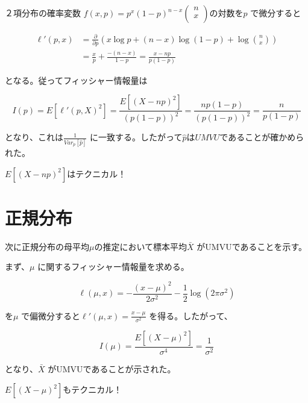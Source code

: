 \documentclass[
  letterpaper,
  DIV=11,
  numbers=noendperiod]{scrartcl}
\theoremstyle{plain}
\theoremstyle{remark}
\begin{document}
２項分布の確率変数 \(f(x,p)=p^x(1-p)^{n-x}\begin{pmatrix}
n  \\
x  \\
\end{pmatrix}\)の対数を\(p\) で微分すると

\[
\begin{aligned}
    \ell'(p, x) &= \frac{\partial}{\partial p} \left( x \log p + (n - x) \log (1 - p) + \log \binom{n}{x} \right) \\
    &= \frac{x}{p}+\frac{-(n-x)}{1-p} = \frac{x-np}{p(1-p)}
\end{aligned}
\]

となる。従ってフィッシャー情報量は

\[
I(p)=E[\ell'(p,X)^2]=\frac{E[(X-np)^2]}{(p(1-p))^2} =\frac{np(1-p)}{(p(1-p))^2} = \frac{n}{p(1-p)}
\]

となり、これは\(\displaystyle \frac{1}{Var_p[\hat{p}]}\)
に一致する。したがって\(\hat{p}\)は\(UMVU\)であることが確かめられた。

\(E[(X-np)^2]\)はテクニカル！

\section{正規分布}\label{ux6b63ux898fux5206ux5e03}

次に正規分布の母平均\(\mu\)の推定において標本平均\(\bar{X}\)
がUMVUであることを示す。

まず、\(\mu\) に関するフィッシャー情報量を求める。

\[
\ell(\mu,x)= - \frac{(x-\mu)^2}{2\sigma^2} - \frac{1}{2} \log(2\pi \sigma^2)
\]

を\(\mu\)
で偏微分すると\(\displaystyle \ell'(\mu,x)=\frac{x-\mu}{\sigma^2}\)
を得る。したがって、

\[
I(\mu)=\frac{E[(X-\mu)^2]}{\sigma^4} = \frac{1}{\sigma^2}
\]

となり、\(\bar{X}\) がUMVUであることが示された。

\(E[(X-\mu)^2]\)もテクニカル！
\end{document}
